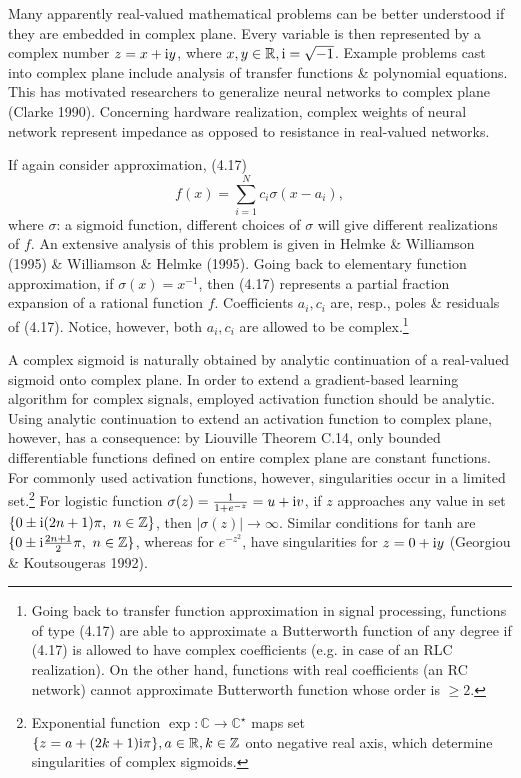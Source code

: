 \documentclass{article}
\begin{document}
\begin{enumerate}
\begin{itemize}
\begin{itemize}
			Many apparently real-valued mathematical problems can be better understood if they are embedded in complex plane. Every variable is then represented by a complex number $z = x + {\rm i}y$, where $x,y\in\mathbb{R},{\rm i} = \sqrt{-1}$. Example problems cast into complex plane include analysis of transfer functions \& polynomial equations. This has motivated researchers to generalize neural networks to complex plane (Clarke 1990). Concerning hardware realization, complex weights of neural network represent impedance as opposed to resistance in real-valued networks.
			
			If again consider approximation, (4.17)
			\begin{equation}
				f(x) = \sum_{i=1}^N c_i\sigma(x - a_i),
			\end{equation}
			where $\sigma$: a sigmoid function, different choices of $\sigma$ will give different realizations of $f$. An extensive analysis of this problem is given in Helmke \& Williamson (1995) \& Williamson \& Helmke (1995). Going back to elementary function approximation, if $\sigma(x) = x^{-1}$, then (4.17) represents a partial fraction expansion of a rational function $f$. Coefficients $a_i,c_i$ are, resp., poles \& residuals of (4.17). Notice, however, both $a_i,c_i$ are allowed to be complex.\footnote{Going back to transfer function approximation in signal processing, functions of type (4.17) are able to approximate a Butterworth function of any degree if (4.17) is allowed to have complex coefficients (e.g. in case of an RLC realization). On the other hand, functions with real coefficients (an RC network) cannot approximate  Butterworth function whose order is $\ge2$.}
			
			A complex sigmoid is naturally obtained by analytic continuation of a real-valued sigmoid onto complex plane. In order to extend a gradient-based learning algorithm for complex signals, employed activation function should be analytic. Using analytic continuation to extend an activation function to complex plane, however, has a consequence: by Liouville Theorem C.14, only bounded differentiable functions defined on entire complex plane are constant functions. For commonly used activation functions, however, singularities occur in a limited set.\footnote{Exponential function $\exp:\mathbb{C}\to\mathbb{C}^\star$ maps set $\{z = a + (2k + 1){\rm i}\pi\},a\in\mathbb{R},k\in\mathbb{Z}$ onto negative real axis, which determine singularities of complex sigmoids.} For logistic function $\sigma(z) = \frac{1}{1 + e^{-z}} = u + {\rm i}v$, if $z$ approaches any value in set $\{0\pm{\rm i}(2n + 1)\pi,\ n\in\mathbb{Z}\}$, then $|\sigma(z)|\to\infty$. Similar conditions for tanh are $\{0\pm{\rm i}\frac{2n + 1}{2}\pi,\ n\in\mathbb{Z}\}$, whereas for $e^{-z^2}$, have singularities for $z = 0 + {\rm i}y$ (Georgiou \& Koutsougeras 1992).
			

\end{itemize}
\end{itemize}
\end{enumerate}
\end{document}
